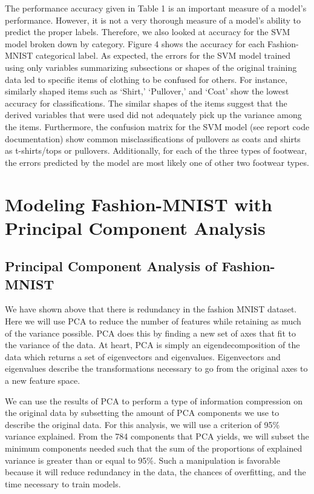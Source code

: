 \documentclass{article}
\begin{document}
The performance accuracy given in Table 1 is an important measure of a
model's performance. However, it is not a very thorough measure of a
model's ability to predict the proper labels. Therefore, we also looked
at accuracy for the SVM model broken down by category. Figure 4 shows
the accuracy for each Fashion-MNIST categorical label. As expected, the
errors for the SVM model trained using only variables summarizing
subsections or shapes of the original training data led to specific
items of clothing to be confused for others. For instance, similarly
shaped items such as `Shirt,' `Pullover,' and `Coat' show the lowest
accuracy for classifications. The similar shapes of the items suggest
that the derived variables that were used did not adequately pick up the
variance among the items. Furthermore, the confusion matrix for the SVM
model (see report code documentation) show common misclassifications of
pullovers as coats and shirts as t-shirts/tops or pullovers.
Additionally, for each of the three types of footwear, the errors
predicted by the model are most likely one of other two footwear types.

\hypertarget{modeling-fashion-mnist-with-principal-component-analysis}{%
\section{Modeling Fashion-MNIST with Principal Component
Analysis}\label{modeling-fashion-mnist-with-principal-component-analysis}}

\hypertarget{principal-component-analysis-of-fashion-mnist}{%
\subsection{Principal Component Analysis of
Fashion-MNIST}\label{principal-component-analysis-of-fashion-mnist}}

\label{sec:headings}

We have shown above that there is redundancy in the fashion MNIST
dataset. Here we will use PCA to reduce the number of features while
retaining as much of the variance possible. PCA does this by finding a
new set of axes that fit to the variance of the data. At heart, PCA is
simply an eigendecomposition of the data which returns a set of
eigenvectors and eigenvalues. Eigenvectors and eigenvalues describe the
transformations necessary to go from the original axes to a new feature
space.

We can use the results of PCA to perform a type of information
compression on the original data by subsetting the amount of PCA
components we use to describe the original data. For this analysis, we
will use a criterion of 95\% variance explained. From the 784 components
that PCA yields, we will subset the minimum components needed such that
the sum of the proportions of explained variance is greater than or
equal to 95\%. Such a manipulation is favorable because it will reduce
redundancy in the data, the chances of overfitting, and the time
necessary to train models.
\end{document}
